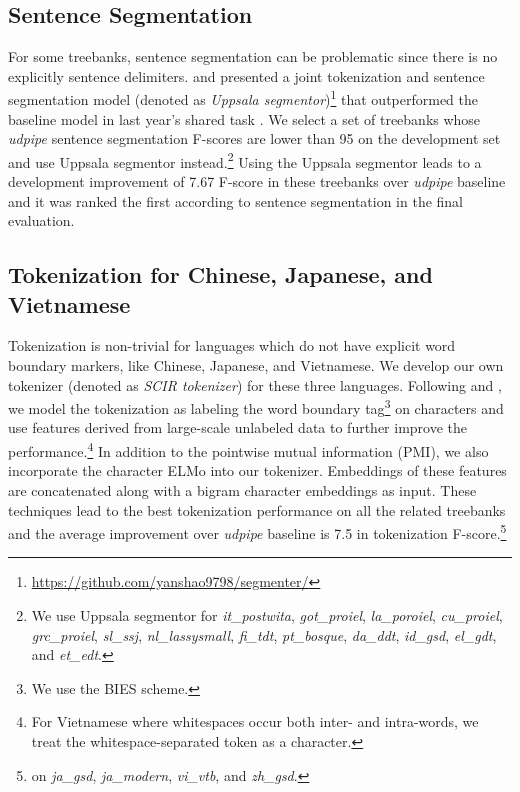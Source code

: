 \documentclass[11pt,a4paper]{article}
\begin{document}
\subsection{Sentence Segmentation}
For some treebanks, sentence segmentation can be problematic
since there is no explicitly sentence delimiters.
\citet{delhoneux-EtAl:2017:K17-3} and \citet{DBLP:journals/corr/abs-1709-03756}
presented a joint tokenization and
sentence segmentation model (denoted as \textit{Uppsala segmentor})\footnote{\url{https://github.com/yanshao9798/segmenter/}}
that outperformed the baseline model in last year's shared task \cite{udst:overview2017}.
We select a set of treebanks whose \textit{udpipe} sentence segmentation F-scores
are lower than 95 on the development set and use Uppsala segmentor instead.\footnote{We
	use Uppsala segmentor for \textit{it\_postwita}, \textit{got\_proiel}, \textit{la\_poroiel}, \textit{cu\_proiel},
	\textit{grc\_proiel}, \textit{sl\_ssj}, \textit{nl\_lassysmall}, \textit{fi\_tdt}, \textit{pt\_bosque}, \textit{da\_ddt}, \textit{id\_gsd},
	\textit{el\_gdt}, and \textit{et\_edt}.}
Using the Uppsala segmentor leads to a development improvement of 
7.67 F-score in these treebanks over \textit{udpipe} baseline
and it was ranked the first according to sentence segmentation
in the final evaluation.

\subsection{Tokenization for Chinese, Japanese, and Vietnamese}

Tokenization is non-trivial for languages 
which do not have explicit word boundary markers, like Chinese, Japanese, and Vietnamese.
We develop our own tokenizer (denoted as \textit{SCIR tokenizer}) for these three languages.
Following \citet{che-EtAl:2017:K17-3} and \citet{10.1007/978-3-319-69005-6_6}, we model the tokenization as labeling the
word boundary tag\footnote{We use the BIES scheme.} on characters and 
use features derived from large-scale unlabeled data to further improve the performance.\footnote{For Vietnamese where whitespaces occur both inter- and intra-words, we treat the whitespace-separated token as a character.}
In addition to the pointwise mutual information (PMI), we also incorporate
the character ELMo into our tokenizer.
Embeddings of these features are concatenated along with a bigram character embeddings
as input.
These techniques lead to the best tokenization performance on all the related treebanks
and the average improvement over \textit{udpipe} baseline is 7.5 in tokenization F-score.\footnote{on \textit{ja\_gsd}, \textit{ja\_modern}, \textit{vi\_vtb}, and \textit{zh\_gsd}.}
\end{document}

